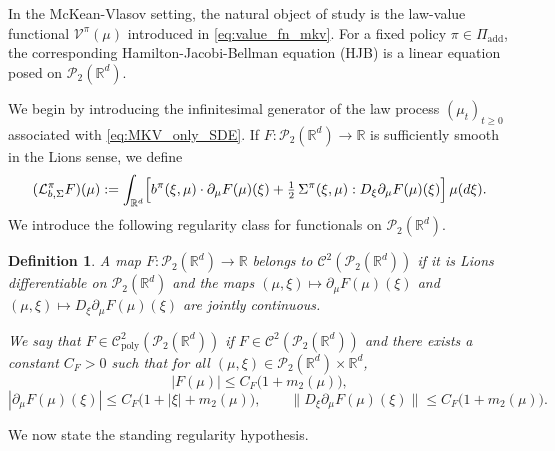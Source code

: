 \documentclass[a4paper, 10pt, english, reqno]{amsart}
\newtheorem{definition}[theorem]{Definition}
\begin{document}
In the McKean-Vlasov setting, the natural object of study is the
law-value functional $\mathcal V^\pi(\mu)$ introduced in
\eqref{eq:value_fn_mkv}. For a fixed policy $\pi\in\Pi_{\mathrm{add}}$, the
corresponding Hamilton-Jacobi-Bellman equation (HJB) is a linear equation posed on
$\mathcal P_2(\mathbb R^d)$.

We begin by introducing the infinitesimal generator of the law process
$(\mu_t)_{t\ge0}$ associated with \eqref{eq:MKV_only_SDE}. If
$ F:\mathcal P_2(\mathbb R^d)\to\mathbb R$ is sufficiently
smooth in the Lions sense, we define
\begin{equation}
\label{eq:L-pi-mkv}
  \begin{aligned}
    (\mathcal L_{b,\Sigma}^{\pi} F)(\mu)
    :=
    \int_{\mathbb R^d}
      \Bigl[
        b^{\pi}(\xi,\mu)\cdot \partial_{\mu} F(\mu)(\xi)
        + \tfrac{1}{2}\,\Sigma^{\pi}(\xi,\mu)
          : D_\xi\partial_{\mu} F(\mu)(\xi)
      \Bigr]\,\mu(d\xi).
  \end{aligned}
\end{equation}
We introduce the following regularity class
for functionals on $\mathcal P_2(\mathbb R^d)$.

\begin{definition}\label{def:C2poly_mkv}
A map $ F:\mathcal P_2(\mathbb R^d)\to\mathbb R$ belongs to
$\mathcal C^2(\mathcal P_2(\mathbb R^d))$ if it is Lions
differentiable on $\mathcal P_2(\mathbb R^d)$ and the maps
$(\mu,\xi)\mapsto \partial_\mu F(\mu)(\xi)$ and
$(\mu,\xi)\mapsto D_\xi\partial_\mu F(\mu)(\xi)$ are jointly
continuous.

We say that
$ F\in\mathcal C^2_{\mathrm{poly}}(\mathcal P_2(\mathbb R^d))$
if $ F\in\mathcal C^2(\mathcal P_2(\mathbb R^d))$ and there
exists a constant $C_{ F}>0$ such that for all
$(\mu,\xi)\in\mathcal P_2(\mathbb R^d)\times\mathbb R^d$,
\[
| F(\mu)|
\le C_{ F}\bigl(1+m_2(\mu)\bigr),
\]
\[
|\partial_\mu F(\mu)(\xi)|
\le C_{ F}\bigl(1+|\xi|+m_2(\mu)\bigr),
\qquad
\|D_\xi\partial_\mu F(\mu)(\xi)\|
\le C_{ F}\bigl(1+m_2(\mu)\bigr).
\]
\end{definition}

We now state the standing regularity hypothesis.
\end{document}
